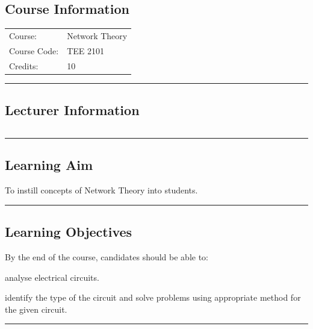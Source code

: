 
\subsection*{Course Information}
\vspace{0ex}%
\noindent\parbox{0.5\textwidth}{%
    \noindent\begin{tabular}{@{}ll}
                 \textsf{Course:}          & 	Network Theory \\
                 \textsf{Course Code:}         & 	TEE 2101    \\
                 \textsf{Credits:}    & 	10
    \end{tabular}}
\vspace{2ex}\hrule\vspace{2ex}

\subsection*{Lecturer Information}
\noindent\parbox{0.5\textwidth}{%
    \noindent\begin{tabular}{@{}ll}
                 
    \end{tabular}}
\vspace{2ex}\hrule\vspace{2ex}


\subsection*{Learning Aim}
To instill concepts of Network Theory into students.
\vspace{2ex} \hrule\vspace{2ex}

\subsection*{Learning Objectives}
By the end of the course, candidates should be able to:
\begin{outline}
    \1 analyse electrical circuits.

    \1 identify the type of the circuit and solve problems using appropriate method for the given circuit.
\end{outline}
\vspace{2ex}\hrule\vspace{2ex}

